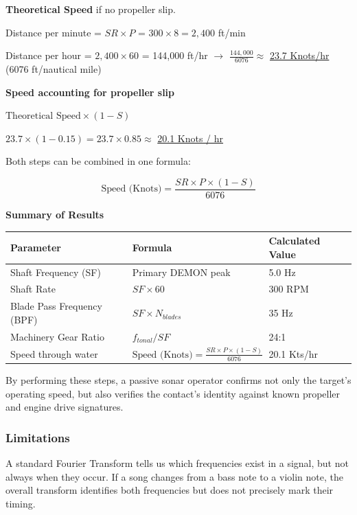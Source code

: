 \textbf{Theoretical Speed} if no propeller slip.

\begin{compactenum}
    \item Distance per minute = $SR \times P$ = $300 \times 8 = 2,400$ ft/min
    \item Distance per hour = $2,400 \times 60$ = 144,000 ft/hr $\rightarrow$ $\frac{144,000}{6076} \approx$ \underline{23.7 Knots/hr} (6076 ft/nautical mile)
\end{compactenum}

\textbf{Speed accounting for propeller slip}

\begin{compactenum}
    \item $\text{Theoretical Speed} \times (1 - S)$
    \item $23.7 \times (1 - 0.15) = 23.7 \times 0.85 \approx$ \underline{20.1 Knots / hr}
\end{compactenum}

Both steps can be combined in one formula:

\[
    \text{Speed (Knots)} = \frac{SR \times P \times ( 1 - S)}{6076}
\]

\textbf{Summary of Results}

\begin{tabularx}{\linewidth}{lll}
    Parameter & Formula & Calculated Value \\
    \hline
    \rowcolor[gray]{.8}Shaft Frequency (SF) & Primary DEMON peak & 5.0 Hz \\
    Shaft Rate & $SF \times 60$ & 300 RPM \\
    \rowcolor[gray]{.8}Blade Pass Frequency (BPF)	& $SF \times N_{blades}$ & 35 Hz \\
    Machinery Gear Ratio & $f_{tonal}/SF$ & 24:1 \\
    \rowcolor[gray]{.8}Speed through water & $\text{Speed (Knots)} = \frac{SR \times P \times (1 - S)}{6076}$ & 20.1 Kts/hr \\
    \bottomrule
\end{tabularx}

By performing these steps, a passive sonar operator confirms not only the target's operating speed, but also verifies the contact's identity against known propeller and engine drive signatures.

\subsubsection{Limitations}
A standard Fourier Transform tells us which frequencies exist in a signal, but not always when they occur. If a song changes from a bass note to a violin note, the overall transform identifies both frequencies but does not precisely mark their timing.

